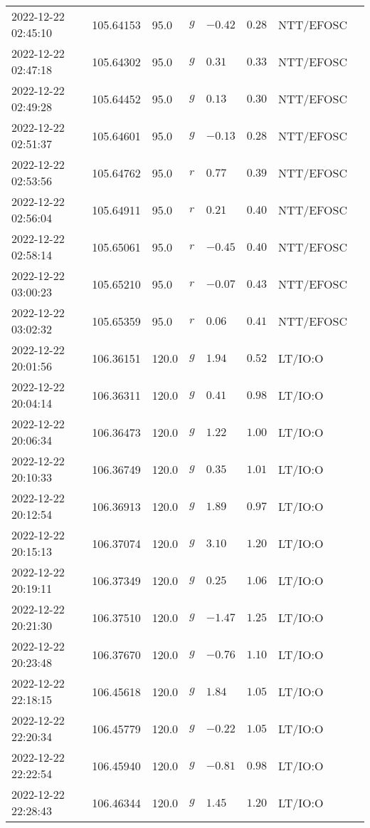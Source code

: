 \documentclass{nature_plusfigure}
\begin{document}
\begin{supplement}
\begin{center}
\begin{longtable}{llllllll}
2022-12-22 02:45:10 & 105.64153 & 95.0 & $g$ & $-0.42$ & $0.28$ & NTT/EFOSC &  \\ 
2022-12-22 02:47:18 & 105.64302 & 95.0 & $g$ & $0.31$ & $0.33$ & NTT/EFOSC &  \\ 
2022-12-22 02:49:28 & 105.64452 & 95.0 & $g$ & $0.13$ & $0.30$ & NTT/EFOSC &  \\ 
2022-12-22 02:51:37 & 105.64601 & 95.0 & $g$ & $-0.13$ & $0.28$ & NTT/EFOSC &  \\ 
2022-12-22 02:53:56 & 105.64762 & 95.0 & $r$ & $0.77$ & $0.39$ & NTT/EFOSC &  \\ 
2022-12-22 02:56:04 & 105.64911 & 95.0 & $r$ & $0.21$ & $0.40$ & NTT/EFOSC &  \\ 
2022-12-22 02:58:14 & 105.65061 & 95.0 & $r$ & $-0.45$ & $0.40$ & NTT/EFOSC &  \\ 
2022-12-22 03:00:23 & 105.65210 & 95.0 & $r$ & $-0.07$ & $0.43$ & NTT/EFOSC &  \\ 
2022-12-22 03:02:32 & 105.65359 & 95.0 & $r$ & $0.06$ & $0.41$ & NTT/EFOSC &  \\ 
2022-12-22 20:01:56 & 106.36151 & 120.0 & $g$ & $1.94$ & $0.52$ & LT/IO:O &  \\ 
2022-12-22 20:04:14 & 106.36311 & 120.0 & $g$ & $0.41$ & $0.98$ & LT/IO:O &  \\ 
2022-12-22 20:06:34 & 106.36473 & 120.0 & $g$ & $1.22$ & $1.00$ & LT/IO:O &  \\ 
2022-12-22 20:10:33 & 106.36749 & 120.0 & $g$ & $0.35$ & $1.01$ & LT/IO:O &  \\ 
2022-12-22 20:12:54 & 106.36913 & 120.0 & $g$ & $1.89$ & $0.97$ & LT/IO:O &  \\ 
2022-12-22 20:15:13 & 106.37074 & 120.0 & $g$ & $3.10$ & $1.20$ & LT/IO:O &  \\ 
2022-12-22 20:19:11 & 106.37349 & 120.0 & $g$ & $0.25$ & $1.06$ & LT/IO:O &  \\ 
2022-12-22 20:21:30 & 106.37510 & 120.0 & $g$ & $-1.47$ & $1.25$ & LT/IO:O &  \\ 
2022-12-22 20:23:48 & 106.37670 & 120.0 & $g$ & $-0.76$ & $1.10$ & LT/IO:O &  \\ 
2022-12-22 22:18:15 & 106.45618 & 120.0 & $g$ & $1.84$ & $1.05$ & LT/IO:O &  \\ 
2022-12-22 22:20:34 & 106.45779 & 120.0 & $g$ & $-0.22$ & $1.05$ & LT/IO:O &  \\ 
2022-12-22 22:22:54 & 106.45940 & 120.0 & $g$ & $-0.81$ & $0.98$ & LT/IO:O &  \\ 
2022-12-22 22:28:43 & 106.46344 & 120.0 & $g$ & $1.45$ & $1.20$ & LT/IO:O &  \\ 

\end{longtable}
\end{center}
\end{supplement}
\end{document}
